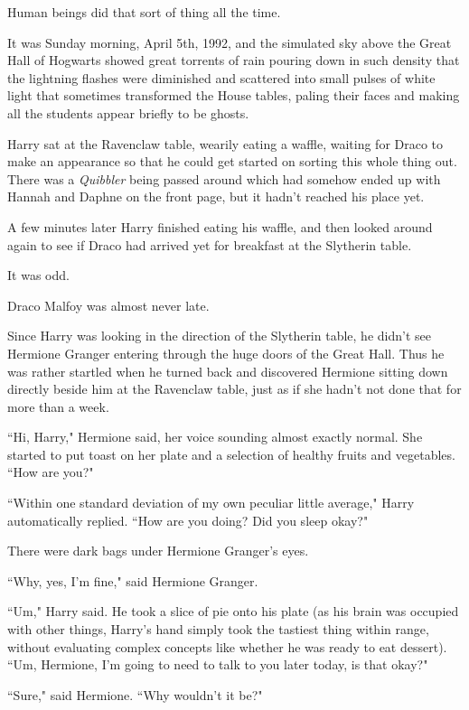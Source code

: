 Human beings did that sort of thing all the time.

\later

It was Sunday morning, April 5th, 1992, and the simulated sky above the Great Hall of Hogwarts showed great torrents of rain pouring down in such density that the lightning flashes were diminished and scattered into small pulses of white light that sometimes transformed the House tables, paling their faces and making all the students appear briefly to be ghosts.

Harry sat at the Ravenclaw table, wearily eating a waffle, waiting for Draco to make an appearance so that he could get started on sorting this whole thing out. There was a \emph{Quibbler} being passed around which had somehow ended up with Hannah and Daphne on the front page, but it hadn't reached his place yet.

A few minutes later Harry finished eating his waffle, and then looked around again to see if Draco had arrived yet for breakfast at the Slytherin table.

It was odd.

Draco Malfoy was almost never late.

Since Harry was looking in the direction of the Slytherin table, he didn't see Hermione Granger entering through the huge doors of the Great Hall. Thus he was rather startled when he turned back and discovered Hermione sitting down directly beside him at the Ravenclaw table, just as if she hadn't not done that for more than a week.

``Hi, Harry," Hermione said, her voice sounding almost exactly normal. She started to put toast on her plate and a selection of healthy fruits and vegetables. ``How are you?"

``Within one standard deviation of my own peculiar little average," Harry automatically replied. ``How are you doing? Did you sleep okay?"

There were dark bags under Hermione Granger's eyes.

``Why, yes, I'm fine," said Hermione Granger.

``Um," Harry said. He took a slice of pie onto his plate (as his brain was occupied with other things, Harry's hand simply took the tastiest thing within range, without evaluating complex concepts like whether he was ready to eat dessert). ``Um, Hermione, I'm going to need to talk to you later today, is that okay?"

``Sure," said Hermione. ``Why wouldn't it be?"

